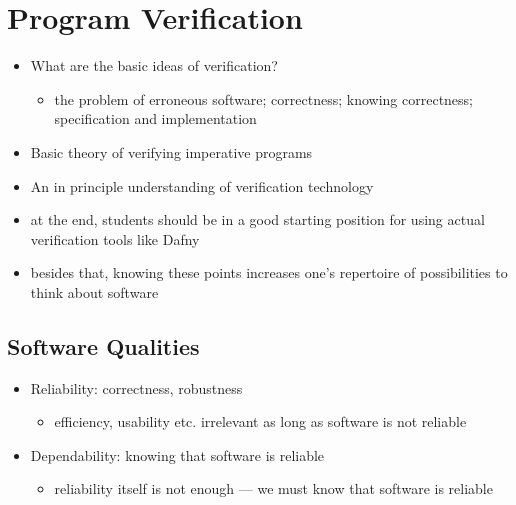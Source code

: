 \hypertarget{program-verification}{%
\section{Program Verification}\label{program-verification}}

\begin{itemize}
\tightlist
\item
  What are the basic ideas of verification?

  \begin{itemize}
  \tightlist
  \item
    the problem of erroneous software; correctness; knowing correctness;
    specification and implementation
  \end{itemize}
\item
  Basic theory of verifying imperative programs
\item
  An in principle understanding of verification technology
\item
  at the end, students should be in a good starting position for using
  actual verification tools like Dafny
\item
  besides that, knowing these points increases one's repertoire of
  possibilities to think about software
\end{itemize}

\hypertarget{software-qualities}{%
\subsection{Software Qualities}\label{software-qualities}}

\begin{itemize}
\tightlist
\item
  Reliability: correctness, robustness

  \begin{itemize}
  \tightlist
  \item
    efficiency, usability etc. irrelevant as long as software is not
    reliable
  \end{itemize}
\item
  Dependability: knowing that software is reliable

  \begin{itemize}
  \tightlist
  \item
    reliability itself is not enough --- we must know that software is
    reliable
  \end{itemize}
\end{itemize}

